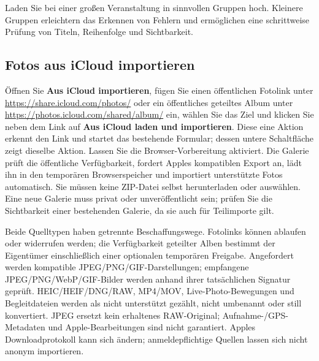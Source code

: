 \documentclass[11pt,a4paper]{article}
\newcommand{\ui}[1]{\textbf{#1}}
\begin{document}
Laden Sie bei einer großen Veranstaltung in sinnvollen Gruppen hoch. Kleinere
Gruppen erleichtern das Erkennen von Fehlern und ermöglichen eine schrittweise
Prüfung von Titeln, Reihenfolge und Sichtbarkeit.


\subsection{Fotos aus iCloud importieren}
Öffnen Sie \ui{Aus iCloud importieren}, fügen Sie einen öffentlichen Fotolink
unter \url{https://share.icloud.com/photos/} oder ein öffentliches geteiltes
Album unter \url{https://photos.icloud.com/shared/album/} ein, wählen Sie das
Ziel und klicken Sie neben dem Link auf \ui{Aus iCloud laden und importieren}.
Diese eine Aktion erkennt den Link und startet das bestehende Formular; dessen
untere Schaltfläche zeigt dieselbe Aktion. Lassen Sie die Browser-Vorbereitung
aktiviert. Die Galerie prüft die öffentliche Verfügbarkeit, fordert Apples
kompatiblen Export an, lädt ihn in den temporären Browserspeicher und importiert
unterstützte Fotos automatisch. Sie müssen keine ZIP-Datei selbst herunterladen
oder auswählen. Eine neue Galerie muss privat oder unveröffentlicht sein; prüfen
Sie die Sichtbarkeit einer bestehenden Galerie, da sie auch für Teilimporte
gilt.

Beide Quelltypen haben getrennte Beschaffungswege. Fotolinks können ablaufen
oder widerrufen werden; die Verfügbarkeit geteilter Alben bestimmt der
Eigentümer einschließlich einer optionalen temporären Freigabe. Angefordert
werden kompatible JPEG/PNG/GIF-Darstellungen; empfangene
JPEG/PNG/WebP/GIF-Bilder werden anhand ihrer tatsächlichen Signatur geprüft.
HEIC/HEIF/DNG/RAW, MP4/MOV, Live-Photo-Bewegungen und Begleitdateien werden als
nicht unterstützt gezählt, nicht umbenannt oder still konvertiert. JPEG ersetzt
kein erhaltenes RAW-Original; Aufnahme-/GPS-Metadaten und Apple-Bearbeitungen
sind nicht garantiert. Apples Downloadprotokoll kann sich ändern;
anmeldepflichtige Quellen lassen sich nicht anonym importieren.
\end{document}
